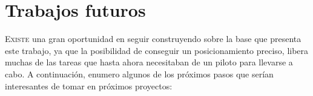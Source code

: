 




\chapter{Trabajos futuros}

\lettrine[lraise=-0.1, lines=2, loversize=0.2]{E}{xiste} una gran oportunidad en seguir construyendo sobre la base que presenta este trabajo, ya que la posibilidad de conseguir un posicionamiento preciso, libera muchas de las tareas que hasta ahora necesitaban de un piloto para llevarse a cabo. A continuación, enumero algunos de los próximos pasos que serían interesantes de tomar en próximos proyectos: 

